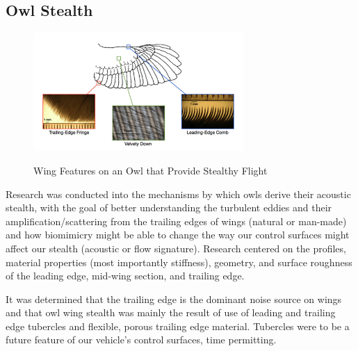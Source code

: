 \documentclass{report}
\begin{document}
\subsection{Owl Stealth}
\begin{figure}[h]
\centering
\includegraphics[width=8cm]{"Owl Stealth"}
\caption{Wing Features on an Owl that Provide Stealthy Flight}
\cite{OwlWing}
\end{figure}
Research was conducted into the mechanisms by which owls derive their acoustic stealth, with the goal of better understanding the turbulent eddies and their amplification/scattering from the trailing edges of wings (natural or man-made) and how biomimicry might be able to change the way our control surfaces might affect our stealth (acoustic or flow signature).  Research centered on the profiles, material properties (most importantly stiffness), geometry, and surface roughness of the leading edge, mid-wing section, and trailing edge.\par
It was determined that the trailing edge is the dominant noise source on wings and that owl wing stealth was mainly the result of use of leading and trailing edge tubercles and flexible, porous trailing edge material.  Tubercles were to be a future feature of our vehicle's control surfaces, time permitting.
\end{document}
